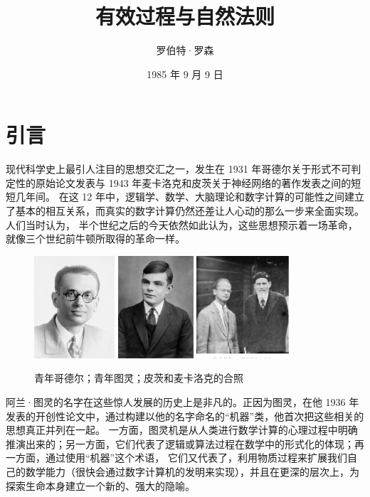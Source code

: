 \documentclass[a4paper,12pt]{article}
\title{有效过程与自然法则}
\date{1985 年 9 月 9 日}
\author{罗伯特·罗森}
\begin{document}
\maketitle{}

\renewcommand\contentsname{目录}
\setcounter{tocdepth}{2}
\tableofcontents

\section{引言}

现代科学史上最引人注目的思想交汇之一，发生在 1931 年哥德尔关于形式不可判定性的原始论文发表与 1943 年麦卡洛克和皮茨关于神经网络的著作发表之间的短短几年间。
在这 12 年中，逻辑学、数学、大脑理论和数字计算的可能性之间建立了基本的相互关系，而真实的数字计算仍然还差让人心动的那么一步来全面实现。人们当时认为，
半个世纪之后的今天依然如此认为，这些思想预示着一场革命，就像三个世纪前牛顿所取得的革命一样。

\begin{figure}[ht]
\centering
\includegraphics[height=1.5in]{images/kurt_godel.jpg}
\includegraphics[height=1.5in]{images/alan_turing.jpg}
\includegraphics[height=1.5in]{images/pitts_mcculloch_1949.png}
\caption{青年哥德尔；青年图灵；皮茨和麦卡洛克的合照}
\end{figure}

阿兰·图灵的名字在这些惊人发展的历史上是非凡的。正因为图灵，在他 1936 年发表的开创性论文中，通过构建以他的名字命名的“机器”类，他首次把这些相关的思想真正并列在一起。
一方面，图灵机是从人类进行数学计算的心理过程中明确推演出来的；另一方面，它们代表了逻辑或算法过程在数学中的形式化的体现；再一方面，通过使用“机器”这个术语，
它们又代表了，利用物质过程来扩展我们自己的数学能力（很快会通过数字计算机的发明来实现），并且在更深的层次上，为探索生命本身建立一个新的、强大的隐喻。
\end{document}
